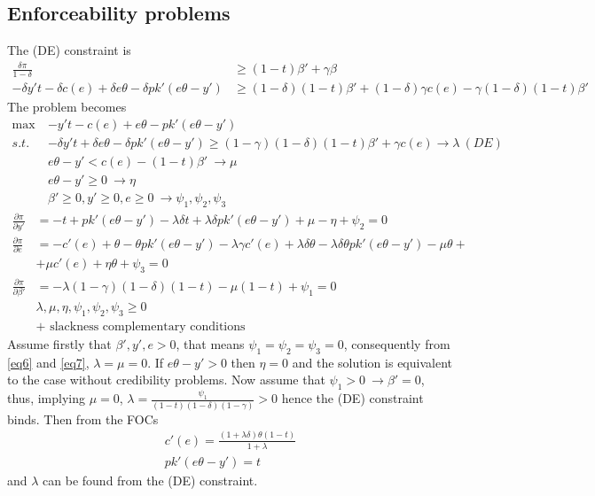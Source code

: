 \documentclass[a4paper]{article}
\begin{document}
\subsection{Enforceability problems}
The (DE) constraint is
\begin{align*}
\frac{\delta \pi}{1 - \delta} &\ge (1 - t)\beta' + \gamma \beta\\
-\delta y't - \delta c(e) + \delta e \theta -\delta pk'(e \theta - y') &\ge (1 - \delta)(1 - t)\beta' + (1 - \delta)\gamma c(e) - \gamma (1 - \delta )(1 - t)\beta'
\end{align*}
The problem becomes
\begin{align*}
\max\ &-y't - c(e) + e \theta -pk'(e \theta - y')\\
s.t.\ &-\delta y't + \delta e \theta -\delta pk'(e \theta - y') \ge (1 - \gamma)(1 - \delta)(1 - t)\beta' + \gamma c(e)\to \lambda \ (DE)\\
& e \theta - y' < c(e) - (1-t)\beta'\ \to \mu \\
& e\theta - y' \ge 0\ \to \eta\\
& \beta' \ge 0, y' \ge 0, e \ge 0\ \to \psi_1, \psi_2,\psi_3
\end{align*}
\begin{align}
\frac{\partial \pi}{\partial y'} &= -t + pk'(e \theta - y') - \lambda \delta t + \lambda \delta pk'(e \theta - y') + \mu - \eta + \psi_2 = 0 \label{eq4}\\
\frac{\partial \pi}{\partial e} &= -c'(e)+\theta - \theta pk'(e\theta - y')- \lambda \gamma c'(e) + \lambda \delta \theta - \lambda \delta \theta pk'(e \theta - y') - \mu \theta + \nonumber\\
&+\mu c'(e) + \eta \theta+ \psi_3 = 0\label{eq5}\\
\frac{\partial \pi}{\partial \beta'} &= - \lambda(1-\gamma)(1-\delta)(1-t) - \mu(1-t) + \psi_1 = 0\label{eq6}\\
& \lambda, \mu, \eta, \psi_1, \psi_2, \psi_3 \ge 0 \label{eq7}\\
&+\text{ slackness complementary conditions}\nonumber
\end{align}
Assume firstly that $\beta', y', e >0$, that means $\psi_1 = \psi_2=\psi_3 = 0$, consequently from \eqref{eq6} and \eqref{eq7}, $\lambda = \mu = 0$. If $e \theta - y' > 0$ then $\eta = 0$ and the solution is equivalent to the case without credibility problems. Now assume that $\psi_1 > 0\ \to \beta' = 0$, thus, implying $\mu = 0$, $\lambda = \frac{\psi_1}{(1-t)(1-\delta)(1-\gamma)} > 0$ hence the (DE) constraint binds. Then from the FOCs
\begin{align*}
c'(e) = \frac{(1 + \lambda \delta)\theta(1-t)}{1+\lambda}\\
pk'(e\theta - y') = t
\end{align*}
and $\lambda$ can be found from the (DE) constraint.
\end{document}
